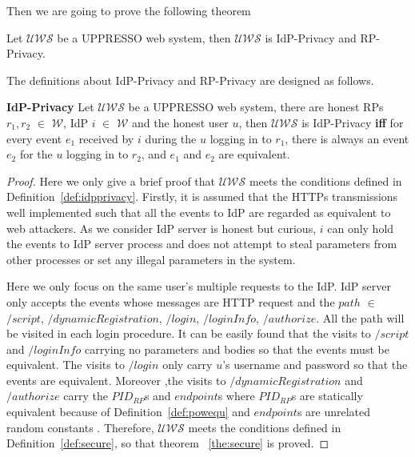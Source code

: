 {Then we are going to prove the following theorem
\begin{theorem}
Let  $\mathcal{UWS}$ be a UPPRESSO web system, then $\mathcal{UWS}$ is IdP-Privacy and RP-Privacy. 
\label{the:privacy}
\end{theorem}
The definitions about IdP-Privacy and RP-Privacy are designed as follows.
\begin{definition}
\vspace{1mm}\noindent\textbf{IdP-Privacy} Let  $\mathcal{UWS}$ be a UPPRESSO web system, there are honest RPs $r_1, r_2$ $\in$ $\mathcal{W}$, IdP $i$ $\in$ $\mathcal{W}$ and the honest user $u$, then $\mathcal{UWS}$ is IdP-Privacy \textbf{iff} for every event $e_1$ received by $i$ during the $u$ logging in to $r_1$, there is always an event $e_2$ for the $u$ logging in to $r_2$, and $e_1$ and $e_2$ are equivalent.
\label{def:idpprivacy}
\end{definition}
\begin{proof}
Here we only give a brief proof that $\mathcal{UWS}$ meets the conditions defined in Definition~\ref{def:idpprivacy}. 
Firstly, it is assumed that the HTTPs transmissions well implemented  such that all the events to IdP are regarded as equivalent to web attackers.
As we consider IdP server is honest but curious, $i$ can only hold the events to IdP server process and does not attempt to steal parameters from other processes or set any illegal parameters in the system. 

Here we only focus on the same user's multiple requests to the IdP.  IdP server only accepts the events whose messages are HTTP request and the $path$ $\in$ {$/script$, $/dynamicRegistration$, $/login$, $/loginInfo$, $/authorize$}.
All the path will be visited in each login procedure. It can be easily found that the visits to $/script$ and $/loginInfo$ carrying no parameters and bodies so that the events must be equivalent. The visits to $/login$ only carry $u$'s username and password so that the events are equivalent. Moreover ,the visits to $/dynamicRegistration$ and $/authorize$ carry the $PID_{RP}$s and $endpoint$s where $PID_{RP}$s are statically equivalent because of Definition~\ref{def:powequ} and $endpoint$s are unrelated random constants . Therefore, $\mathcal{UWS}$ meets the conditions defined in Definition~\ref{def:secure}, so that theorem ~\ref{the:secure} is proved. 
\end{proof}


}
